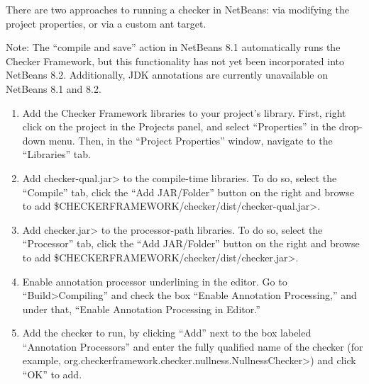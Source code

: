 
There are two approaches to running a checker in NetBeans:  via modifying the
project properties, or via a custom ant target.

Note: The ``compile and save'' action in NetBeans 8.1 automatically
runs the Checker Framework, but this functionality has not yet
been incorporated into NetBeans 8.2. Additionally, JDK annotations
are currently unavailable on NetBeans 8.1 and 8.2.




\begin{enumerate}
\item
  Add the Checker Framework libraries to your project's
  library. First, right click on the project in the Projects panel,
  and select ``Properties'' in the drop-down menu. Then, in the
  ``Project Properties'' window, navigate to the ``Libraries'' tab.

\item
  Add \<checker-qual.jar> to the compile-time libraries. To do so,
  select the ``Compile'' tab, click the ``Add JAR/Folder'' button on
  the right and browse to
  add \<\$CHECKERFRAMEWORK/checker/dist/checker-qual.jar>.

\item
  Add \<checker.jar> to the processor-path libraries. To do so, select
  the ``Processor'' tab, click the ``Add JAR/Folder'' button on the
  right and browse to
  add \<\$CHECKERFRAMEWORK/checker/dist/checker.jar>.

\item
  Enable annotation processor underlining in the editor. Go to
  ``Build>Compiling'' and check the box ``Enable Annotation
  Processing,'' and under that, ``Enable Annotation Processing in
  Editor.''

\item
  Add the checker to run, by clicking ``Add'' next to the box labeled
  ``Annotation Processors'' and enter the fully qualified name of the
  checker (for
  example, \<org.checkerframework.checker.nullness.NullnessChecker>)
  and click ``OK'' to add.
\end{enumerate}

